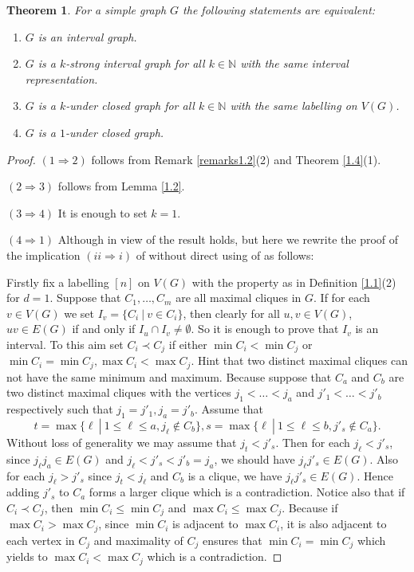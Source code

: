 \documentclass[12pt,reqno]{amsart}
\theoremstyle{plain}
\newtheorem{theorem}{Theorem}[section]
\theoremstyle{definition}
\numberwithin{equation}{section}
\begin{document}
\begin{theorem}\label{A}
For a simple graph $G$ the following statements are equivalent:
\begin{enumerate}
\item $G$ is an interval graph.

\item $G$ is a $k$-strong interval graph for all $k\in \mathbb{N}$ with the same interval representation.

\item  $G$ is a $k$-under closed graph for all $k\in \mathbb{N}$ with the same labelling on $V(G)$.

\item $G$ is a $1$-under closed graph.
\end{enumerate}
\end{theorem}
\begin{proof}
$(1\Longrightarrow 2)$ follows from Remark \ref{remarks1.2}(2) and  Theorem \ref{1.4}(1).

$(2\Longrightarrow 3)$ follows from Lemma \ref{1.2}.

$(3\Longrightarrow 4)$ It is enough to set $k=1$.

$(4\Longrightarrow 1)$ Although in view of \cite[Theorem 4]{Ol} the result holds, but here we rewrite the proof of the implication  $(ii \Longrightarrow i)$  of \cite[Theorem 4]{Ol} without direct using of \cite[Theorem 2]{GH} as follows:

Firstly fix a labelling $[n]$ on $V(G)$ with the property as in Definition \ref{1.1}(2) for $d=1$. Suppose that $C_1, \dots, C_m$ are all maximal cliques in $G$. If for each $v\in V(G)$ we set $I_v=\{C_i \ | \ v\in C_i\}$, then clearly for all $u,v\in V(G)$, $uv\in E(G)$ if and only if $I_u\cap I_v\neq \emptyset$. So it is enough to prove that $I_v$ is an interval. To this aim set $C_i\prec C_j$ if either $\min C_i <\min C_j$ or $\min C_i=\min C_j, \max C_i<\max C_j$. Hint that two distinct maximal cliques can not have the same minimum and maximum. Because suppose that $C_a$ and $C_b$ are two distinct maximal cliques with the vertices $j_1<\dots <j_a$ and $j'_1< \dots <j'_b$ respectively such that $j_1=j'_1, j_a=j'_b$. Assume that
$$t=\max\{\ell \ | \ 1\leq \ell \leq a, j_\ell\not\in C_b\}, s=\max\{\ell \ | \ 1\leq \ell \leq b, j'_s\not\in C_a\}.$$
 Without loss of generality we may assume that $j_t<j'_s$. Then for each $j_\ell<j'_s$, since $j_\ell j_a\in E(G)$ and $j_\ell<j'_s<j'_b=j_a$, we should have $j_\ell j'_s\in E(G)$. Also for each $j_\ell>j'_s$ since $j_t<j_\ell$ and $C_b$ is a clique, we have $j_\ell j'_s\in E(G)$. Hence adding $j'_s$ to $C_a$ forms a larger clique which is a contradiction. Notice also that if $C_i\prec C_j$, then $\min C_i \leq \min C_j$ and $\max C_i\leq \max C_j$. Because if $\max C_i>\max C_j$, since $\min C_i$ is adjacent to $\max C_i$, it is also adjacent to each vertex in $C_j$ and maximality of $C_j$ ensures that $\min C_i=\min C_j$ which yields to $\max C_i <\max C_j$ which is a contradiction.


\end{proof}
\end{document}
